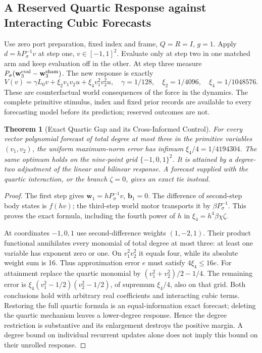 \documentclass[11pt,a4paper]{article}
\newtheorem{theorem}{Theorem}[section]
\theoremstyle{definition}
\begin{document}
\subsection{A Reserved Quartic Response against Interacting Cubic Forecasts}

Use zero port preparation, fixed index and frame, $Q=R=I$, $g=1$.
Apply $d=hP_\sigma^{-1}v$ at step one, $v\in[-1,1]^2$. Evaluate only at
step two in one matched arm and keep evaluation off in the other. At step
three measure $P_\sigma(\mathbf w^{\rm eval}_3-\mathbf w^{\rm sham}_3)$.
The new response is exactly
\[
 V(v)=\gamma L_0v+\xi_2v_1v_2u+\xi_4v_1^2v_2^2u,
 \quad\gamma=1/128,\quad\xi_2=1/4096,\quad\xi_4=1/1048576.
\]
These are counterfactual world consequences of the force in the dynamics.
The complete primitive stimulus, index and fixed prior records are available
to every forecasting model before its prediction; reserved outcomes are not.

\begin{theorem}[Exact Quartic Gap and its Cross-Informed Control]
\label{thm:bridge-quartic-cubic-gap}
For every vector polynomial forecast of total degree at most three in the
primitive variables $(v_1,v_2)$, the uniform maximum-norm error has infimum
$\xi_4/4=1/4194304$. The same optimum holds on the nine-point grid
$\{-1,0,1\}^2$. It is attained by a degree-two adjustment of the linear and
bilinear response. A forecast supplied with the quartic interaction, or
the branch $\zeta=0$, gives an exact tie instead.
\end{theorem}
\begin{proof}
The first step gives $\mathbf w_1=hP_\sigma^{-1}v$, $\mathbf b_1=0$.
The difference of second-step body states is $f(hv)$; the third-step world
motor transports it by $\beta P_\sigma^{-1}$. This proves the exact formula,
including the fourth power of $h$ in $\xi_4=h^4\beta\chi\zeta$.

At coordinates $-1,0,1$ use second-difference weights $(1,-2,1)$.
Their product functional annihilates every monomial of total degree at most
three: at least one variable has exponent zero or one. On $v_1^2v_2^2$ it
equals four, while its absolute weight sum is 16. Thus approximation error
$e$ must satisfy $4\xi_4\le16e$. For attainment replace the quartic monomial
by $(v_1^2+v_2^2)/2-1/4$. The remaining error is
$\xi_4(v_1^2-1/2)(v_2^2-1/2)$, of supremum $\xi_4/4$, also on that grid.
Both conclusions hold with arbitrary real coefficients and interacting cubic
terms. Restoring the full quartic formula is an equal-information exact
forecast; deleting the quartic mechanism leaves a lower-degree response.
Hence the degree restriction is substantive and its enlargement destroys
the positive margin. A degree bound on individual recurrent updates alone
does not imply this bound on their unrolled response.
\end{proof}
\end{document}

